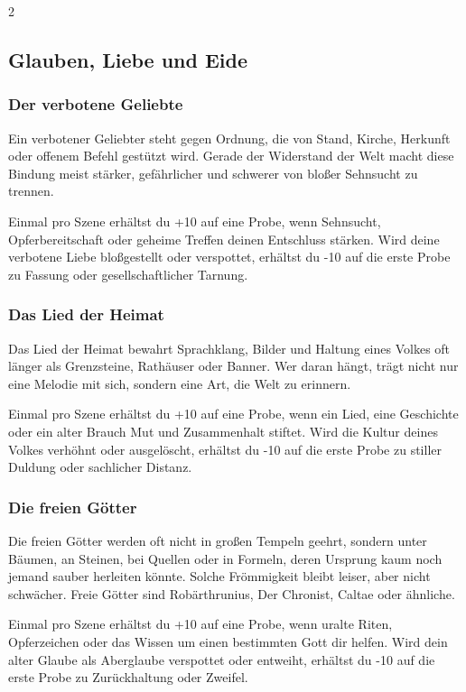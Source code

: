 {\begin{multicols*}{2}
        \subsection{Glauben, Liebe und Eide}\label{subsec:bindungen-glaube}

        \subsubsection*{Der verbotene Geliebte}
        Ein verbotener Geliebter steht gegen Ordnung, die von Stand, Kirche, Herkunft oder offenem Befehl gestützt wird. Gerade der Widerstand der Welt macht diese Bindung meist stärker, gefährlicher und schwerer von bloßer Sehnsucht zu trennen.

        \bindungspielwertebox
        {Einmal pro Szene erhältst du +10 auf eine Probe, wenn Sehnsucht, Opferbereitschaft oder geheime Treffen deinen Entschluss stärken.}
        {Wird deine verbotene Liebe bloßgestellt oder verspottet, erhältst du -10 auf die erste Probe zu Fassung oder gesellschaftlicher Tarnung.}

        \subsubsection*{Das Lied der Heimat}
        Das Lied der Heimat bewahrt Sprachklang, Bilder und Haltung eines Volkes oft länger als Grenzsteine, Rathäuser oder Banner. Wer daran hängt, trägt nicht nur eine Melodie mit sich, sondern eine Art, die Welt zu erinnern.

        \bindungspielwertebox
        {Einmal pro Szene erhältst du +10 auf eine Probe, wenn ein Lied, eine Geschichte oder ein alter Brauch Mut und Zusammenhalt stiftet.}
        {Wird die Kultur deines Volkes verhöhnt oder ausgelöscht, erhältst du -10 auf die erste Probe zu stiller Duldung oder sachlicher Distanz.}

        \subsubsection*{Die freien Götter}
        Die freien Götter werden oft nicht in großen Tempeln geehrt, sondern unter Bäumen, an Steinen, bei Quellen oder in Formeln, deren Ursprung kaum noch jemand sauber herleiten könnte. Solche Frömmigkeit bleibt leiser, aber nicht schwächer. Freie Götter sind Robärthrunius, Der Chronist, Caltae oder ähnliche.

        \bindungspielwertebox
        {Einmal pro Szene erhältst du +10 auf eine Probe, wenn uralte Riten, Opferzeichen oder das Wissen um einen bestimmten Gott dir helfen.}
        {Wird dein alter Glaube als Aberglaube verspottet oder entweiht, erhältst du -10 auf die erste Probe zu Zurückhaltung oder Zweifel.}


\end{multicols*}}
